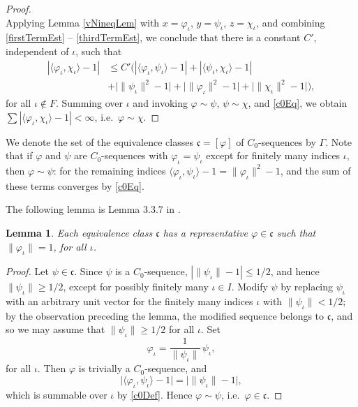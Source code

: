 \documentclass[twoside,11pt,letter]{article}
\def\fc{{\mathfrak{c}}}
\theoremstyle{definition}
\theoremstyle{definition}
\theoremstyle{plain}
\newtheorem{lemma}[theorem]{Lemma}
\begin{document}
\begin{proof}
\begin{equation}
\end{equation}
Applying Lemma \ref{vNineqLem} with $x=\varphi_\iota$, $y=\psi_\iota$, $z=\chi_\iota$, and combining \eqref{firstTermEst} -- \eqref{thirdTermEst}, we conclude that there is a constant $C'$, independent of $\iota$, such that
\begin{equation*}
\begin{split}
|\langle\varphi_\iota,\chi_\iota\rangle-1|&\leq C'\Big(|\langle\varphi_\iota,\psi_\iota\rangle-1|+|\langle\psi_\iota,\chi_\iota\rangle-1|\\
&+\big|\|\psi_\iota\|^2-1\big|+\big|\|\varphi_\iota\|^2-1\big|+\big|\|\chi_\iota\|^2-1\big|\Big),
\end{split}
\end{equation*}
for all $\iota\notin F$. Summing over $\iota$ and invoking $\varphi\sim\psi$, $\psi\sim\chi$, and \eqref{c0Eq}, we obtain $\sum|\langle\varphi_\iota,\chi_\iota\rangle-1|<\infty$, i.e.\ $\varphi\sim\chi$.
\end{proof}

We denote the set of the equivalence classes $\fc=[\varphi]$ of $C_0$-sequences by $\Gamma$. Note that if $\varphi$ and $\psi$ are $C_0$-sequences with $\varphi_\iota=\psi_\iota$ except for finitely many indices $\iota$, then $\varphi\sim\psi$: for the remaining indices $\langle\varphi_\iota,\psi_\iota\rangle-1=\|\varphi_\iota\|^2-1$, and the sum of these terms converges by \eqref{c0Eq}.

The following lemma is Lemma 3.3.7 in \cite{vN39}.
\begin{lemma}\label{unitRep}
Each equivalence class $\fc$ has a representative $\varphi\in\fc$ such that $\|\varphi_\iota\|=1$, for all $\iota$.
\end{lemma}
\begin{proof}
Let $\psi\in\fc$. Since $\psi$ is a $C_0$-sequence, $|\|\psi_\iota\|-1|\leq 1/2$, and hence $\|\psi_\iota\|\geq 1/2$, except for possibly finitely many $\iota\in I$. Modify $\psi$ by replacing $\psi_\iota$ with an arbitrary unit vector for the finitely many indices $\iota$ with $\|\psi_\iota\|<1/2$; by the observation preceding the lemma, the modified sequence belongs to $\fc$, and so we may assume that $\|\psi_\iota\|\geq 1/2$ for all $\iota$. Set
\begin{equation*}
\varphi_\iota=\frac{1}{\|\psi_\iota\|}\,\psi_\iota,
\end{equation*}
for all $\iota$. Then $\varphi$ is trivially a $C_0$-sequence, and
\begin{equation*}
\big|\langle\varphi_\iota,\psi_\iota\rangle-1\big|=\big|\|\psi_\iota\|-1\big|,
\end{equation*}
which is summable over $\iota$ by \eqref{c0Def}. Hence $\varphi\sim\psi$, i.e.\ $\varphi\in\fc$.
\end{proof}
\end{document}
